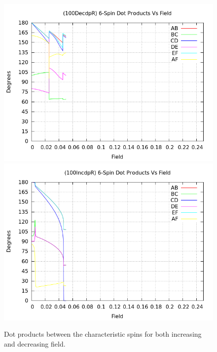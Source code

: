 \documentclass{article}
\begin{document}
\begin{figure}[ht]
\centering
\includegraphics[scale=0.5]{HVariedData/Pictures/100DecdpR.png}
\includegraphics[scale=0.5]{HVariedData/Pictures/100IncdpR.png}
\caption{Dot products between the characteristic spins for both increasing and decreasing field.}
\end{figure}
\clearpage
\end{document}
